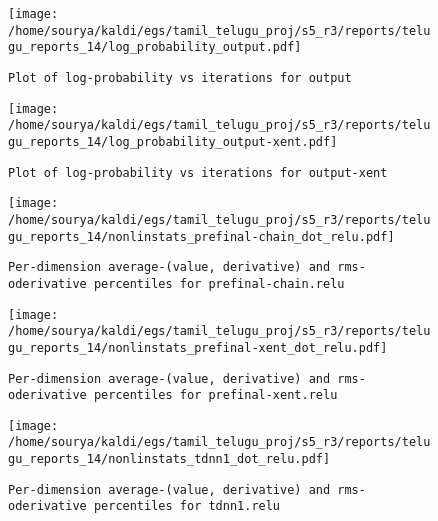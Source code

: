 \documentclass[prl,10pt,twocolumn]{revtex4}
\begin{document}
\newpage
\begin{figure}[h]
  \begin{center}
    \caption{\texttt{Plot of log-probability vs iterations for output}}
    \texttt{[image: /home/sourya/kaldi/egs/tamil\_telugu\_proj/s5\_r3/reports/telugu\_reports\_14/log\_probability\_output.pdf]}
  \end{center}
\end{figure}
\clearpage


\newpage
\begin{figure}[h]
  \begin{center}
    \caption{\texttt{Plot of log-probability vs iterations for output-xent}}
    \texttt{[image: /home/sourya/kaldi/egs/tamil\_telugu\_proj/s5\_r3/reports/telugu\_reports\_14/log\_probability\_output-xent.pdf]}
  \end{center}
\end{figure}
\clearpage


\newpage
\begin{figure}[h]
  \begin{center}
    \caption{\texttt{Per-dimension average-(value, derivative) and rms-oderivative percentiles for prefinal-chain.relu}}
    \texttt{[image: /home/sourya/kaldi/egs/tamil\_telugu\_proj/s5\_r3/reports/telugu\_reports\_14/nonlinstats\_prefinal-chain\_dot\_relu.pdf]}
  \end{center}
\end{figure}
\clearpage


\newpage
\begin{figure}[h]
  \begin{center}
    \caption{\texttt{Per-dimension average-(value, derivative) and rms-oderivative percentiles for prefinal-xent.relu}}
    \texttt{[image: /home/sourya/kaldi/egs/tamil\_telugu\_proj/s5\_r3/reports/telugu\_reports\_14/nonlinstats\_prefinal-xent\_dot\_relu.pdf]}
  \end{center}
\end{figure}
\clearpage


\newpage
\begin{figure}[h]
  \begin{center}
    \caption{\texttt{Per-dimension average-(value, derivative) and rms-oderivative percentiles for tdnn1.relu}}
    \texttt{[image: /home/sourya/kaldi/egs/tamil\_telugu\_proj/s5\_r3/reports/telugu\_reports\_14/nonlinstats\_tdnn1\_dot\_relu.pdf]}
  \end{center}
\end{figure}
\clearpage
\end{document}
